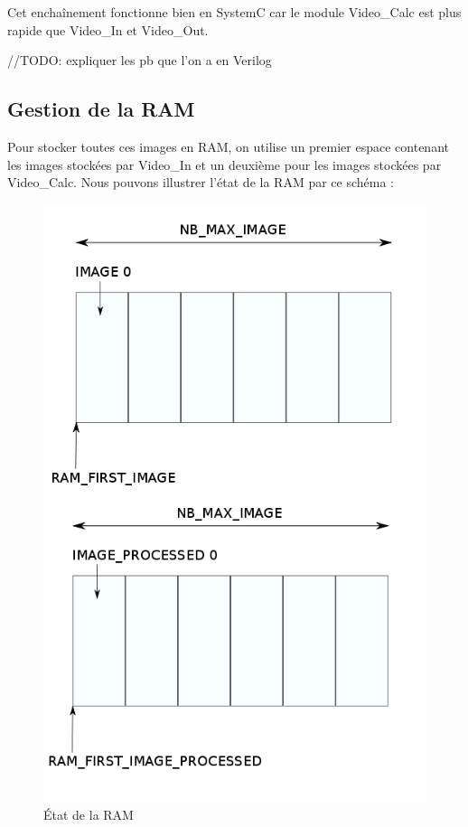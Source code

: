 {{Cet enchaînement fonctionne bien en SystemC car le module Video\_Calc est plus rapide que Video\_In et Video\_Out.

//TODO: expliquer les pb que l'on a en Verilog
}
			\subsection*{Gestion de la RAM}
{
	Pour stocker toutes ces images en RAM, on utilise un premier espace contenant les images stockées par Video\_In et un deuxième pour les images stockées par Video\_Calc. Nous pouvons illustrer l'état de la RAM par ce schéma :

\begin{figure}[!h]
	\centering
	\includegraphics[scale = 0.3]{ram_management.png}
	\caption{État de la RAM}
\end{figure}

}}
